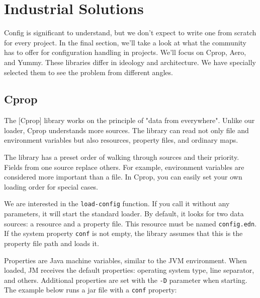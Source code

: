 \section{Industrial Solutions}

Config is significant to understand, but we don't expect to write one from scratch for every project. In the final section, we'll take a look at what the community has to offer for configuration handling in projects. We'll focus on Cprop, Aero, and Yummy. These libraries differ in ideology and architecture. We have specially selected them to see the problem from different angles.

\subsection{Cprop}


The [Cprop] library works on the principle of "data from everywhere". Unlike our loader, Cprop understands more sources. The library can read not only file and environment variables but also resources, property files, and ordinary maps.

The library has a preset order of walking through sources and their priority. Fields from one source replace others. For example, environment variables are considered more important than a file. In Cprop, you can easily set your own loading order for special cases.

We are interested in the \verb|load-config| function. If you call it without any parameters, it will start the standard loader. By default, it looks for two data sources: a resource and a property file. This resource must be named \verb|config.edn|. If the system property \verb|conf| is not empty, the library assumes that this is the property file path and loads it.

Properties are Java machine variables, similar to the JVM environment. When loaded, JM receives the default properties: operating system type, line separator, and others. Additional properties are set with the \verb|-D| parameter when starting. The example below runs a jar file with a \verb|conf| property:


\ifx\DEVICETYPE\MOBILE

\begin{english}
\end{english}

